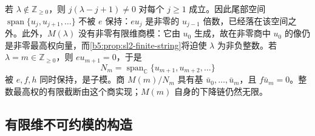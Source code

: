 \ProseParagraphBreak

若 \(\lambda\notin\mathbb Z_{\ge0}\)，则 \(j(\lambda-j+1)\ne0\) 对每个 \(j\ge1\) 成立。因此尾部空间 \(\operatorname{span}\{u_j,u_{j+1},\ldots\}\) 不被 \(e\) 保持：\(eu_j\) 是非零的 \(u_{j-1}\) 倍数，已经落在该空间之外。此外，\(M(\lambda)\) 没有非零有限维商模：它由 \(u_0\) 生成，故在非零商中 \(u_0\) 的像仍是非零最高权向量，而\cref{b5:prop:sl2-finite-string}将迫使 \(\lambda\) 为非负整数。若 \(\lambda=m\in\mathbb Z_{\ge0}\)，则 \(eu_{m+1}=0\)，于是
\[
	N_m=\operatorname{span}_{\mathbb C}\{u_{m+1},u_{m+2},\ldots\}
\]
被 \(e,f,h\) 同时保持，是子模。商 \(M(m)/N_m\) 具有基 \(\bar u_0,\ldots,\bar u_m\)，且 \(f\bar u_m=0\)。整数最高权的有限截断由这个商实现；\(M(m)\) 自身的下降链仍然无限。

\subsection{有限维不可约模的构造}
\label{b5:subsec:1402:02}

